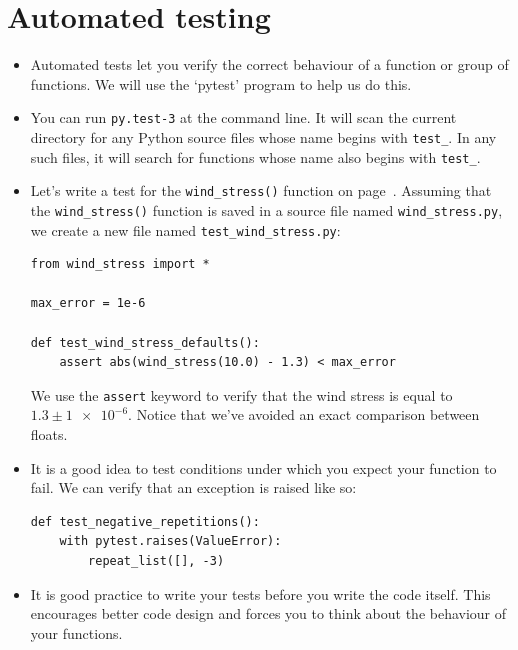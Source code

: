 \documentclass[a4paper,twoside,titlepage]{memoir}
\newcommand{\shellcmd}{\texttt}
\begin{document}
\section{Automated testing}
\begin{itemize}
\item Automated tests let you verify the correct behaviour of a function or group of functions.  We will use the `pytest' program to help us do this. 
\item You can run \shellcmd{py.test-3} at the command line.  It will scan the current directory for any Python source files whose name begins with \shellcmd{test\_}.  In any such files, it will search for functions whose name also begins with \shellcmd{test\_}.
\item Let's write a test for the \shellcmd{wind\_stress()} function on page~\pageref{wind-stress}.  Assuming that the \shellcmd{wind\_stress()} function is saved in a source file named \shellcmd{wind\_stress.py}, we create a new file named \shellcmd{test\_wind\_stress.py}:
\begin{verbatim}
from wind_stress import *

max_error = 1e-6

def test_wind_stress_defaults():
	assert abs(wind_stress(10.0) - 1.3) < max_error
\end{verbatim}
\index{assert@\shellcmd{assert}}
We use the \shellcmd{assert} keyword to verify that the wind stress is equal to $1.3 \pm \num{1e-6}$.  Notice that we've avoided an exact comparison between floats.
\item It is a good idea to test conditions under which you expect your function to fail.  We can verify that an exception is raised like so:
\begin{verbatim}
def test_negative_repetitions():
	with pytest.raises(ValueError):
		repeat_list([], -3)
\end{verbatim}
\item It is good practice to write your tests before you write the code itself.  This encourages better code design and forces you to think about the behaviour of your functions.
\end{itemize}
\end{document}

